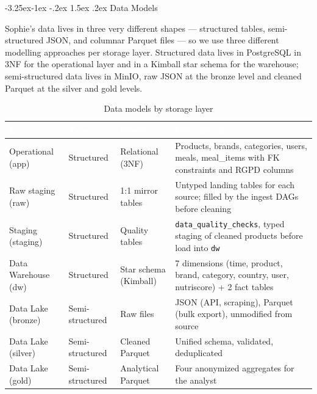 \documentclass[a4paper,11pt,oneside,openany]{report}
\makeatletter
\renewcommand\subsubsection{\@startsection{subsubsection}{3}{\z@}%
  {-3.25ex\@plus -1ex \@minus -.2ex}%
  {1.5ex \@plus .2ex}%
  {\normalfont\normalsize\bfseries\color{ntblue}}}
\makeatother
\begin{document}
\subsubsection{Data Models}

Sophie's data lives in three very different shapes --- structured
tables, semi-structured JSON, and columnar Parquet files --- so we
use three different modelling approaches per storage layer.
Structured data lives in PostgreSQL in 3NF for the operational
layer and in a Kimball star schema for the warehouse;
semi-structured data lives in MinIO, raw JSON at the bronze level
and cleaned Parquet at the silver and gold levels.

\begin{table}[H]
\centering
\caption{Data models by storage layer}
\label{tab:data-models-topo}
\begin{tabularx}{\textwidth}{L{2.5cm} L{2cm} L{3.5cm} L{4.5cm}}
\toprule
{}
\textcolor{white}{\textbf{Layer}} & \textcolor{white}{\textbf{Type}} & \textcolor{white}{\textbf{Model}} & \textcolor{white}{\textbf{Description}} \\
\midrule
{}
Operational (app) & Structured & Relational (3NF) & Products, brands, categories, users, meals, meal\_items with FK constraints and RGPD columns \\
Raw staging (raw) & Structured & 1:1 mirror tables & Untyped landing tables for each source; filled by the ingest DAGs before cleaning \\
Staging (staging) & Structured & Quality tables & \texttt{data\_quality\_checks}, typed staging of cleaned products before load into \texttt{dw} \\
Data Warehouse (dw) & Structured & Star schema (Kimball) & 7 dimensions (time, product, brand, category, country, user, nutriscore) + 2 fact tables \\
Data Lake (bronze) & Semi-structured & Raw files & JSON (API, scraping), Parquet (bulk export), unmodified from source \\
Data Lake (silver) & Semi-structured & Cleaned Parquet & Unified schema, validated, deduplicated \\
Data Lake (gold) & Semi-structured & Analytical Parquet & Four anonymized aggregates for the analyst \\
\bottomrule
\end{tabularx}
\end{table}
\end{document}
